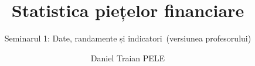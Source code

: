 \title[Statistica piețelor financiare]{Statistica piețelor financiare}
\subtitle{Seminarul 1: Date, randamente și indicatori\ifsolutions\ (versiunea profesorului)\fi}
\author[D.T. Pele]{Daniel Traian PELE}
\date{}

\providecommand{\sfmapplink}[3]{\hypertarget{#2}{}\hyperlink{#1}{\beamergotobutton{#3}}}  %
\providecommand{\sfmappback}[2]{\begin{tikzpicture}[remember picture,overlay]\node[anchor=south east] at ([xshift=-3mm,yshift=7mm]current page.south east){\hyperlink{#1}{\beamerreturnbutton{#2}}};\end{tikzpicture}}  %
\providecommand{\sfmchlink}[2]{\href{#1}{#2}}  %
\providecommand{\sfmchlinkt}[2]{\href{#1}{\usebeamercolor[fg]{frametitle}#2}}  %


